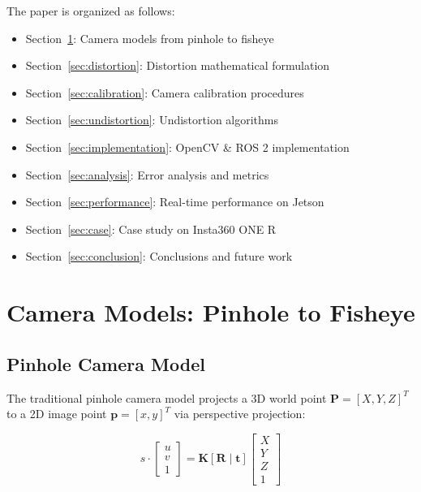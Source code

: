 \documentclass[11pt,a4paper,oneside]{article}
\begin{document}
The paper is organized as follows:
\begin{itemize}
    \item Section~\ref{sec:models}: Camera models from pinhole to fisheye
    \item Section~\ref{sec:distortion}: Distortion mathematical formulation
    \item Section~\ref{sec:calibration}: Camera calibration procedures
    \item Section~\ref{sec:undistortion}: Undistortion algorithms
    \item Section~\ref{sec:implementation}: OpenCV \& ROS 2 implementation
    \item Section~\ref{sec:analysis}: Error analysis and metrics
    \item Section~\ref{sec:performance}: Real-time performance on Jetson
    \item Section~\ref{sec:case}: Case study on Insta360 ONE R
    \item Section~\ref{sec:conclusion}: Conclusions and future work
\end{itemize}


\section{Camera Models: Pinhole to Fisheye}
\label{sec:models}

\subsection{Pinhole Camera Model}

The traditional pinhole camera model projects a 3D world point $\mathbf{P} = [X, Y, Z]^T$ to a 2D image point $\mathbf{p} = [x, y]^T$ via perspective projection:

\begin{equation}
s \cdot \begin{bmatrix} u \\ v \\ 1 \end{bmatrix} = \mathbf{K} [\mathbf{R} \mid \mathbf{t}] \begin{bmatrix} X \\ Y \\ Z \\ 1 \end{bmatrix}
\label{eq:perspective}
\end{equation}
\end{document}
